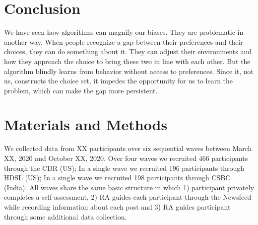 \documentclass[12pt,letterpaper]{article}
\begin{document}


\section{Conclusion}
We have seen how algorithms can magnify our biases. They are problematic in another way. When people recognize a gap between their preferences and their choices, they can do something about it. They can adjust their environments and how they approach the choice to bring these two in line with each other. But the algorithm blindly learns from behavior without access to preferences. Since it, not us, constructs the choice set, it impedes the opportunity for us to learn the problem, which can make the gap more persistent.

\pagebreak
\clearpage
\singlespacing 



\FloatBarrier
\clearpage
\appendix
{}

\section{Materials and Methods}\label{app:materials}

We collected data from XX participants over six sequential waves between March XX, 2020 and October XX, 2020. Over four waves we recruited 466 participants through the CDR (US); In a single wave we recruited 196 participants through HDSL (US); In a single wave we recruited 198 participants through CSBC (India). All waves share the same basic structure in which 1) participant privately completes a self-assessment, 2) RA guides each participant through the Newsfeed while recording information about each post and 3) RA guides participant through some additional data collection.
\end{document}

